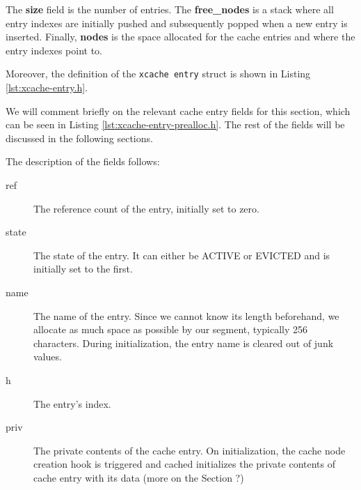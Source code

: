 
The \textbf{size} field is the number of entries. The \textbf{free\_nodes} is a 
stack where all entry indexes are initially pushed and subsequently popped when 
a new entry is inserted. Finally, \textbf{nodes} is the space allocated for the 
cache entries and where the entry indexes point to.

Moreover, the definition of the \texttt{xcache entry} struct is shown in 
Listing \ref{lst:xcache-entry.h}.


We will comment briefly on the relevant cache entry fields for this section, 
which can be seen in Listing \ref{lst:xcache-entry-prealloc.h}. The rest of the 
fields will be discussed in the following sections.


The description of the fields follows:

\begin{description}
	\item[ref] The reference count of the entry, initially set to zero.
	\item[state] The state of the entry. It can either be ACTIVE or EVICTED and 
		is initially set to the first.
	\item[name] The name of the entry. Since we cannot know its length 
		beforehand, we allocate as much space as possible by our segment, 
		typically 256 characters. During initialization, the entry name is 
		cleared out of junk values.
	\item[h] The entry's index.
	\item[priv] The private contents of the cache entry. On initialization, the 
		cache node creation hook is triggered and cached initializes the 
		private contents of cache entry with its data (more on the Section ?)
\end{description}

